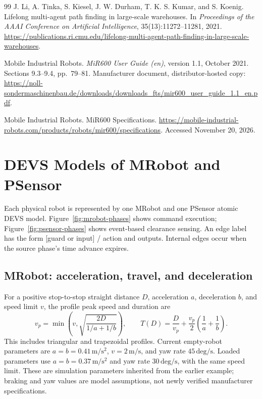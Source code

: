 \documentclass[11pt,a4paper]{article}
\theoremstyle{remark}
\begin{document}
\begin{thebibliography}{99}
J. Li, A. Tinka, S. Kiesel, J. W. Durham, T. K. S. Kumar, and S. Koenig.
\newblock Lifelong multi-agent path finding in large-scale warehouses.
\newblock In \emph{Proceedings of the AAAI Conference on Artificial Intelligence},
35(13):11272--11281, 2021.
\newblock \url{https://publications.ri.cmu.edu/lifelong-multi-agent-path-finding-in-large-scale-warehouses}.

Mobile Industrial Robots.
\newblock \emph{MiR600 User Guide (en)}, version 1.1, October 2021.
\newblock Sections 9.3--9.4, pp.~79--81.
\newblock Manufacturer document, distributor-hosted copy:
\url{https://noll-sondermaschinenbau.de/downloads/downloads_fts/mir600_user_guide_1.1_en.pdf}.

Mobile Industrial Robots.
\newblock MiR600 Specifications.
\newblock \url{https://mobile-industrial-robots.com/products/robots/mir600/specifications}.
\newblock Accessed November 20, 2026.

\end{thebibliography}

\clearpage
\appendix
\section{DEVS Models of MRobot and PSensor}
\label{app:plant-models}
Each physical robot is represented by one MRobot and one PSensor atomic
DEVS model. Figure~\ref{fig:mrobot-phases} shows command execution;
Figure~\ref{fig:psensor-phases} shows event-based clearance sensing.
An edge label has the form [guard or input] / action and outputs.
Internal edges occur when the source phase's time advance expires.

\subsection{MRobot: acceleration, travel, and deceleration}
For a positive stop-to-stop straight distance $D$, acceleration $a$, deceleration
$b$, and speed limit $v$, the profile peak speed and duration are
\begin{equation}
 v_p=\min\!\left(v,\sqrt{\frac{2D}{1/a+1/b}}\right),\qquad
 T(D)=\frac{D}{v_p}+\frac{v_p}{2}\left(\frac1a+\frac1b\right).
 \label{eq:profile}
\end{equation}
This includes triangular and trapezoidal profiles. Current empty-robot
parameters are $a=b=0.41\,\mathrm{m/s^2}$, $v=2\,\mathrm{m/s}$, and yaw rate
$45\,\mathrm{deg/s}$. Loaded parameters use $a=b=0.37\,\mathrm{m/s^2}$ and
yaw rate $30\,\mathrm{deg/s}$, with the same speed limit. These are simulation
parameters inherited from the earlier example; braking and yaw values are
model assumptions, not newly verified manufacturer specifications.
\end{document}
